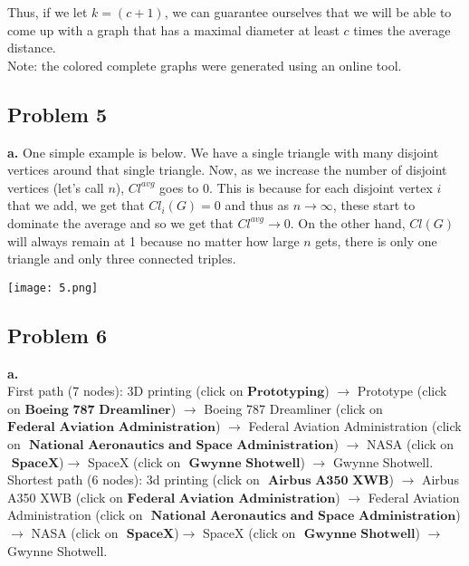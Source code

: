 \documentclass[12 pt]{article}
\begin{document}
	\noindent Thus, if we let $k = (c+1)$, we can guarantee ourselves that we will be able to come up with a graph that has a maximal diameter at least $c$ times the average distance. \\
	
	\noindent Note: the colored complete graphs were generated using an online tool. \\
	
	\subsection*{Problem 5}
	\noindent \textbf{a.} One simple example is below. We have a single triangle with many disjoint vertices around that single triangle. Now, as we increase the number of disjoint vertices (let's call $n$), $Cl^{avg}$ goes to 0. This is because for each disjoint vertex $i$ that we add, we get that $Cl_i(G) = 0$ and thus as $n \rightarrow \infty$, these start to dominate the average and so we get that $Cl^{avg} \rightarrow 0$. On the other hand, $Cl(G)$ will always remain at 1 because no matter how large $n$ gets, there is only one triangle and only three connected triples. 
	
	\begin{center}
	\texttt{[image: 5.png]} 
	\end{center}
	\subsection*{Problem 6}
	\textbf{a.}\\
	\noindent First path (7 nodes): 3D printing (click on $\textbf{Prototyping}$) $\rightarrow$ Prototype (click on $\textbf{Boeing 787 Dreamliner}$) $\rightarrow$ Boeing 787 Dreamliner (click on $\textbf{Federal Aviation Administration}$) $\rightarrow$ Federal Aviation Administration (click on $\textbf{ National Aeronautics and Space Administration}$) $\rightarrow$ NASA (click on $\textbf{ SpaceX}$)$\rightarrow$ SpaceX (click on $\textbf{ Gwynne Shotwell}$) $\rightarrow$ Gwynne Shotwell. \\
	
	\noindent Shortest path (6 nodes): 3d printing (click on $\textbf{ Airbus A350 XWB}$) $\rightarrow$ Airbus A350 XWB (click on $\textbf{Federal Aviation Administration}$) $\rightarrow$ Federal Aviation Administration (click on $\textbf{ National Aeronautics and Space Administration}$) $\rightarrow$ NASA (click on $\textbf{ SpaceX}$)$\rightarrow$ SpaceX (click on $\textbf{ Gwynne Shotwell}$) $\rightarrow$ Gwynne Shotwell. \\ 
	
\end{document}
